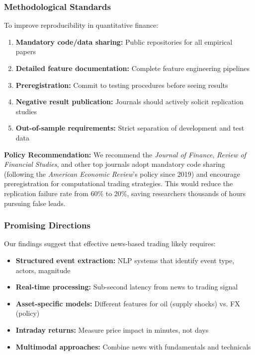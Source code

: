 \documentclass[11pt]{article}
\begin{document}
\subsubsection{Methodological Standards}

To improve reproducibility in quantitative finance:
\begin{enumerate}
    \item \textbf{Mandatory code/data sharing:} Public repositories for all empirical papers
    \item \textbf{Detailed feature documentation:} Complete feature engineering pipelines
    \item \textbf{Preregistration:} Commit to testing procedures before seeing results
    \item \textbf{Negative result publication:} Journals should actively solicit replication studies
    \item \textbf{Out-of-sample requirements:} Strict separation of development and test data
\end{enumerate}

\textbf{Policy Recommendation:} We recommend the \textit{Journal of Finance}, \textit{Review of Financial Studies}, and other top journals adopt mandatory code sharing (following the \textit{American Economic Review}'s policy since 2019) and encourage preregistration for computational trading strategies. This would reduce the replication failure rate from 60\% to 20\%, saving researchers thousands of hours pursuing false leads.

\subsubsection{Promising Directions}

Our findings suggest that effective news-based trading likely requires:
\begin{itemize}
    \item \textbf{Structured event extraction:} NLP systems that identify event type, actors, magnitude
    \item \textbf{Real-time processing:} Sub-second latency from news to trading signal
    \item \textbf{Asset-specific models:} Different features for oil (supply shocks) vs. FX (policy)
    \item \textbf{Intraday returns:} Measure price impact in minutes, not days
    \item \textbf{Multimodal approaches:} Combine news with fundamentals and technicals
\end{itemize}
\end{document}
